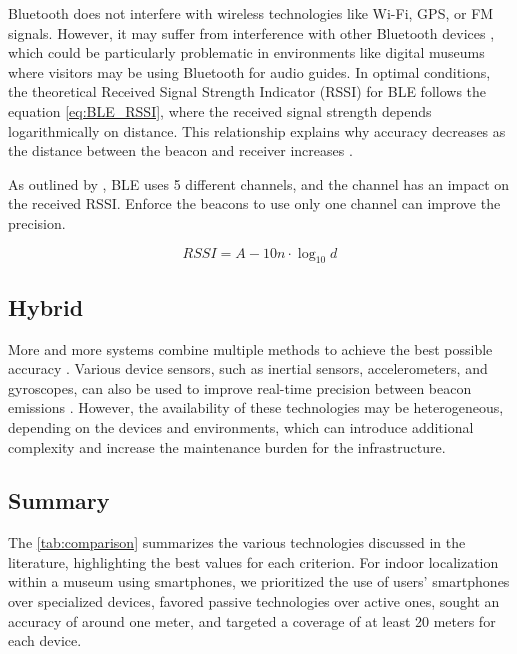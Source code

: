 Bluetooth does not interfere with wireless technologies like Wi-Fi, GPS, or FM signals. However, it may suffer from interference with other Bluetooth devices \cite{spachos_ble_2020}, which could be particularly problematic in environments like digital museums where visitors may be using Bluetooth for audio guides. In optimal conditions, the theoretical Received Signal Strength Indicator (RSSI) for BLE follows the equation \ref{eq:BLE_RSSI}, where the received signal strength depends logarithmically on distance. This relationship explains why accuracy decreases as the distance between the beacon and receiver increases \cite{spachos_ble_2020}. 

As outlined by \cite{barsocchi_detecting_2021}, BLE uses 5 different channels, and the channel has an impact on the received RSSI. Enforce the beacons to use only one channel can improve the precision.  

\begin{equation} \label{eq:BLE_RSSI}
    RSSI = A - 10n \cdot \log_{10}d
\end{equation}

\subsection{Hybrid}

More and more systems combine multiple methods to achieve the best possible accuracy \cite{shang_overview_2022}. Various device sensors, such as inertial sensors, accelerometers, and gyroscopes, can also be used to improve real-time precision between beacon emissions \cite{ali_locali_2017}. However, the availability of these technologies may be heterogeneous, depending on the devices and environments, which can introduce additional complexity and increase the maintenance burden for the infrastructure.

\subsection{Summary}

The \autoref{tab:comparison} summarizes the various technologies discussed in the literature, highlighting the best values for each criterion. For indoor localization within a museum using smartphones, we prioritized the use of users' smartphones over specialized devices, favored passive technologies over active ones, sought an accuracy of around one meter, and targeted a coverage of at least 20 meters for each device.  

